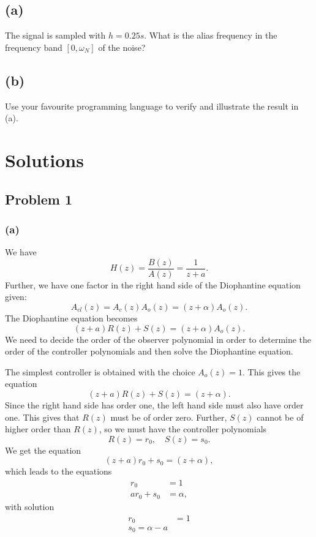 \documentclass{scrartcl}
\begin{document}
\subsection*{(a)}
\label{sec:orgheadline8}
The signal is sampled with \(h=\unit{0.25}{s}\). What is the alias frequency in the frequency band \([0, \omega_N]\) of the noise?

\subsection*{(b)}
\label{sec:orgheadline9}
Use your favourite programming language to verify and illustrate the result in (a).

\section*{Solutions}
\label{sec:orgheadline21}
\subsection*{Problem 1}
\label{sec:orgheadline13}
\subsubsection*{(a)}
\label{sec:orgheadline11}
We have 
\[
    H(z) = \frac{B(z)}{A(z)} = \frac{1}{z + a}.
    \]
Further, we have one factor in the right hand side of the Diophantine equation given:
\[ A_{cl}(z) = A_c(z)A_o(z) = (z+\alpha) A_o(z). \]
The Diophantine equation becomes
\[ (z+a) R(z) + S(z) = (z+\alpha) A_o(z). \]
We need to decide the order of the observer polynomial in order to determine the order of the controller polynomials and then solve the Diophantine equation. 

The simplest controller is obtained with the choice \(A_o(z)=1\). This gives the equation
\[ (z+a) R(z) + S(z) = (z+\alpha). \]
Since the right hand side has order one, the left hand side must also have order one. This gives that \(R(z)\) must be of order zero. Further, \(S(z)\) cannot be of higher order than \(R(z)\), so we must have the controller polynomials
\[ R(z) = r_0, \quad S(z) = s_0. \]
We get the equation
\[ (z+a)r_0 + s_0 = (z+\alpha), \]
which leads to the equations
\begin{align}
r_0 &= 1\\
a r_0 + s_0 &= \alpha,
\end{align}
with solution
\begin{align}
r_0 &= 1\\
s_0 = \alpha-a
\end{align}
\end{document}
